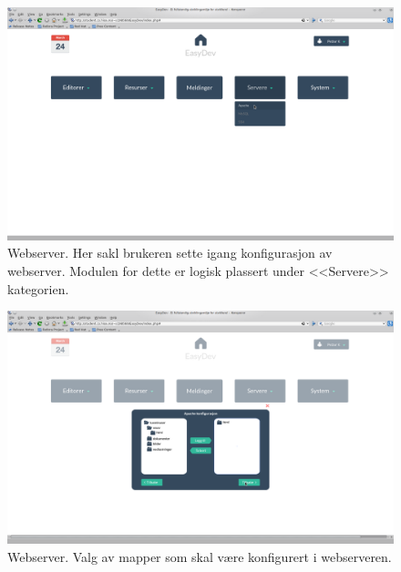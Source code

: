\begin{figure}[ht]
\includegraphics[width=\textwidth,height=\textheight,keepaspectratio]{./img/prosessdokumentasjon/hifi/a1.png}
\caption[Hi-fi Webserver 1]{Webserver. Her sakl brukeren sette igang konfigurasjon av webserver. Modulen for dette er logisk plassert under <<Servere>> kategorien.}
\label{fig:apachehi1}
\end{figure}

\begin{figure}[ht]
\includegraphics[width=\textwidth,height=\textheight,keepaspectratio]{./img/prosessdokumentasjon/hifi/a2.png}
\caption[Hi-fi Webserver 2]{Webserver. Valg av mapper som skal være konfigurert i webserveren.}
\label{fig:apachehi2}
\end{figure}

